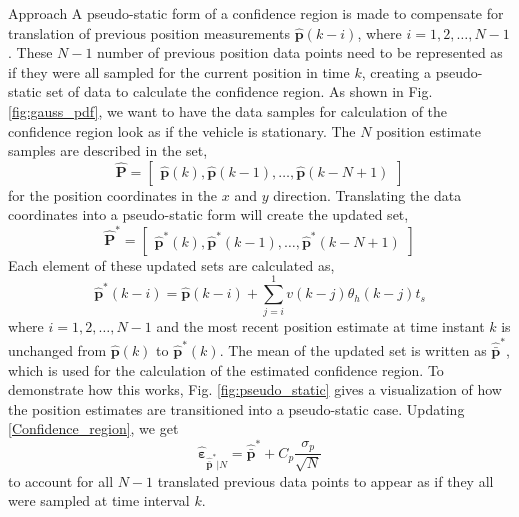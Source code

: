 \begin{section}{Approach}
A pseudo-static form of a confidence region is made to compensate for translation of previous position measurements $\hat{\bm{p}}(k-i)$, where $i=1,2,\dots,N-1$. These $N-1$ number of previous position data points need to be represented as if they were all sampled for the current position in time $k$, creating a pseudo-static set of data to calculate the confidence region. As shown in Fig. \ref{fig:gauss_pdf}, we want to have the data samples for calculation of the confidence region look as if the vehicle is stationary. The $N$ position estimate samples are described in the set,
\begin{equation}
    \hat{\bm{P}}=\begin{bmatrix} \hat{\bm{p}}(k) ,\hat{\bm{p}}(k-1),\dots,\hat{\bm{p}}(k-N+1) \end{bmatrix} 
\end{equation}
for the position coordinates in the $x$ and $y$ direction. Translating the data coordinates into a pseudo-static form will create the updated set,
\begin{equation}
    \hat{\bm{P}}^*=\begin{bmatrix} \hat{\bm{p}}^*(k) ,\hat{\bm{p}}^*(k-1),\dots,\hat{\bm{p}}^*(k-N+1) \end{bmatrix} \nonumber
\end{equation}
Each element of these updated sets are calculated as,
	\begin{equation}
	\hat{\bm{p}}^*(k-i) = \hat{\bm{p}}(k-i)+\sum_{j=i}^1 v(k-j)\theta_h(k-j)t_s 
	\end{equation}
where $i=1,2,\dots,N-1$ and the most recent position estimate at time instant $k$ is unchanged from $\hat{\bm{p}}(k)$ to $\hat{\bm{p}}^*(k)$. The mean of the updated set is written as $\hat{\bar{\bm{p}}}^*$, which is used for the calculation of the estimated confidence region. To demonstrate how this works, Fig. \ref{fig:pseudo_static} gives a visualization of how the position estimates are transitioned into a pseudo-static case. Updating \eqref{Confidence_region}, we get
    \begin{equation}
    \label{Confidence_region_updated}
		\hat{\bm{\varepsilon}}_{\hat{\bar{\bm{p}}}^*|N} = \hat{\bar{\bm{p}}}^* + C_p\frac{\sigma_p}{\sqrt{N}}
	\end{equation}
 to account for all $N-1$ translated previous data points to appear as if they all were sampled at time interval $k$.




\end{section}
